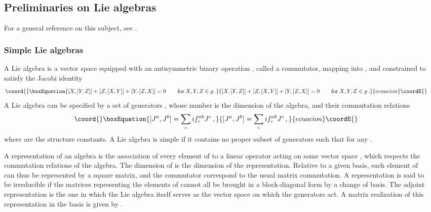 \documentclass[a4paper,12pt]{report}
\begin{document}
\subsection{Preliminaries on Lie algebras}\label{prelLiealg}

For a general reference on this subject, see \cite{wyb}.

\subsubsection{Simple Lie algebras}

A Lie algebra \coordHE{} is a vector space equipped with an antisymmetric binary operation \myHighlight{$[\;,\,]$}\coordHE{}, called a
commutator, mapping \coordHE{} into \coordHE{}, and constrained to satisfy the Jacobi identity
\begin{equation}\coord{}\boxEquation{
[X,[Y,Z]]+[Z,[X,Y]]+[Y,[Z,X]]=0 \qquad \textrm{for} \:X,Y,Z\in g\,.
}{
[X,[Y,Z]]+[Z,[X,Y]]+[Y,[Z,X]]=0 \qquad \textrm{for} \:X,Y,Z\in g\,.
}{ecuacion}\coordE{}\end{equation}
A Lie algebra can be specified by a set of generators \coordHE{}, whose number is the dimension of the
algebra, and their commutation relations
\begin{equation}\coord{}\boxEquation{
[J^{a},J^{b}]=\sum_{c}if^{ab}_{c}J^{c}\,,
}{
[J^{a},J^{b}]=\sum_{c}if^{ab}_{c}J^{c}\,,
}{ecuacion}\coordE{}\end{equation}
where \coordHE{} are the structure constants. A Lie algebra is simple if it contains no proper subset of
generators \coordHE{} such that \coordHE{} for any \coordHE{}.

A representation of an algebra is the association of every element of \coordHE{} to a linear operator acting on some
vector space \coordHE{}, which respects the commutation relations of the algebra. The dimension of \coordHE{} is the dimension
of the representation. Relative to a given basis, each element of \coordHE{} can thus be represented by a square matrix,
and the commutator correspond to the usual matrix commutation. A representation is said to be irreducible if the
matrices representing the elements of \coordHE{} cannot all be brought in a block-diagonal form by a change of basis.
The adjoint representation is the one in which the Lie algebra itself serves as the vector space on which the
generators act. A matrix realization of this representation in the basis \coordHE{} is given by
\coordHE{}.
\end{document}
